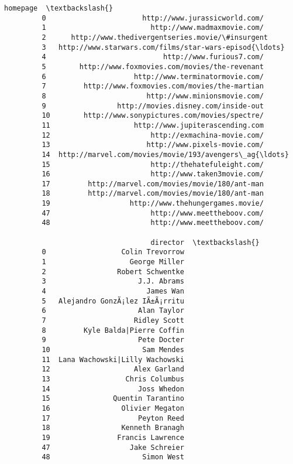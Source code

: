 \documentclass[11pt]{article}
\begin{document}
\begin{Verbatim}[commandchars=\\\{\}]
                                                      homepage  \textbackslash{}
         0                       http://www.jurassicworld.com/   
         1                         http://www.madmaxmovie.com/   
         2      http://www.thedivergentseries.movie/\#insurgent   
         3   http://www.starwars.com/films/star-wars-episod{\ldots}   
         4                            http://www.furious7.com/   
         5        http://www.foxmovies.com/movies/the-revenant   
         6                     http://www.terminatormovie.com/   
         7         http://www.foxmovies.com/movies/the-martian   
         8                        http://www.minionsmovie.com/   
         9                 http://movies.disney.com/inside-out   
         10        http://www.sonypictures.com/movies/spectre/   
         11                    http://www.jupiterascending.com   
         12                        http://exmachina-movie.com/   
         13                       http://www.pixels-movie.com/   
         14  http://marvel.com/movies/movie/193/avengers\_ag{\ldots}   
         15                        http://thehatefuleight.com/   
         16                        http://www.taken3movie.com/   
         17         http://marvel.com/movies/movie/180/ant-man   
         18         http://marvel.com/movies/movie/180/ant-man   
         19                   http://www.thehungergames.movie/   
         47                        http://www.meettheboov.com/   
         48                        http://www.meettheboov.com/   
         
                                   director  \textbackslash{}
         0                  Colin Trevorrow   
         1                    George Miller   
         2                 Robert Schwentke   
         3                      J.J. Abrams   
         4                        James Wan   
         5   Alejandro GonzÃ¡lez IÃ±Ã¡rritu   
         6                      Alan Taylor   
         7                     Ridley Scott   
         8         Kyle Balda|Pierre Coffin   
         9                      Pete Docter   
         10                      Sam Mendes   
         11  Lana Wachowski|Lilly Wachowski   
         12                    Alex Garland   
         13                  Chris Columbus   
         14                     Joss Whedon   
         15               Quentin Tarantino   
         16                 Olivier Megaton   
         17                     Peyton Reed   
         18                 Kenneth Branagh   
         19                Francis Lawrence   
         47                   Jake Schreier   
         48                      Simon West   
         

\end{Verbatim}
\end{document}
